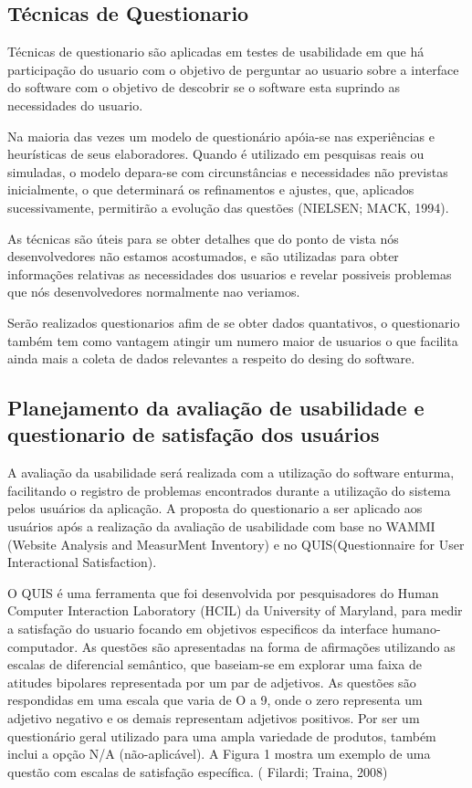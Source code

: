 \subsection{Técnicas de Questionario}
	Técnicas de questionario são aplicadas em testes de usabilidade em que há participação do usuario com o objetivo de perguntar ao usuario sobre a interface do software com o objetivo de descobrir se o software esta suprindo as necessidades do usuario.

	Na maioria das vezes um modelo de questionário apóia-se nas experiências e
	heurísticas de seus elaboradores. Quando é utilizado em pesquisas reais ou simuladas, o
	modelo depara-se com circunstâncias e necessidades não previstas inicialmente, o que
	determinará os refinamentos e ajustes, que, aplicados sucessivamente, permitirão a
	evolução das questões (NIELSEN; MACK, 1994). 
	
	As técnicas são úteis para se obter detalhes que do ponto de vista nós desenvolvedores não estamos acostumados, e são utilizadas para obter informações relativas as necessidades dos usuarios e revelar possiveis problemas que nós desenvolvedores normalmente nao veriamos.
	
	Serão realizados questionarios afim de se obter dados quantativos, o questionario também tem como vantagem atingir um numero maior de usuarios o que facilita ainda mais a coleta de dados relevantes a respeito do desing do software.
	
	


\subsection{Planejamento da avaliação de usabilidade e questionario de satisfação dos usuários}
	A avaliação da usabilidade será realizada com a utilização do software enturma, facilitando o registro de problemas encontrados durante a utilização do sistema pelos usuários da aplicação.
	A proposta do questionario a ser aplicado aos usuários após a realização da avaliação de usabilidade com base no WAMMI (Website Analysis and MeasurMent Inventory) e no QUIS(Questionnaire for User Interactional Satisfaction).


	O QUIS é uma ferramenta que foi desenvolvida por pesquisadores do Human Computer Interaction Laboratory (HCIL) da University of Maryland, para medir a satisfação do usuario focando em objetivos especificos da interface humano-computador.
	As questões são apresentadas na forma de afirmações
utilizando as escalas de diferencial semântico, que
baseiam-se em explorar uma faixa de atitudes bipolares
representada por um par de adjetivos. As questões são
respondidas em uma escala que varia de O a 9, onde o zero
representa um adjetivo negativo e os demais representam
adjetivos positivos. Por ser um questionário geral utilizado
para uma ampla variedade de produtos, também inclui a
opção N/A (não-aplicável). A Figura 1 mostra um exemplo
de uma questão com escalas de satisfação específica. ( Filardi; Traina, 2008)

